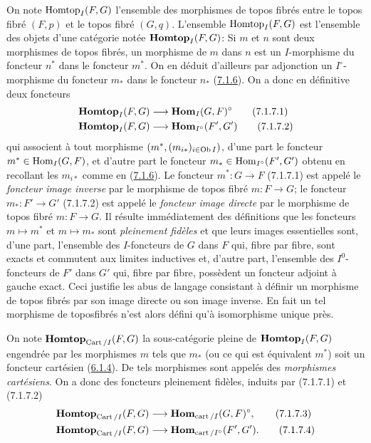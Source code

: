 \documentclass[10pt]{../fichiers-configuration-latex/smfart}
\begin{document}
On note $\operatorname{Homtop}_I (F, G)$ l'ensemble des morphismes de topos fibrés
entre le topos fibré $(F, p)$ et le topos fibré $(G, q)$. L'ensemble
$\operatorname{Homtop}_I(F, G)$ est l'ensemble des objets d'une catégorie notée
$\operatorname{\mathbf{Homtop}}_I(F, G)$: Si $m$ et $n$ sont deux morphismes de topos
fibrés, un morphisme de $m$ dans $n$ est un $I$-morphisme du
foncteur $n^{\ast}$ dans le foncteur $m^{\ast}$. On en déduit
d'ailleurs par adjonction un $I^{\circ}$-morphisme du foncteur
$m_{\ast}$ dans le foncteur $n_{\ast}$ (\hyperref[VI.subsubsec7.1.6]{7.1.6}). On
a donc en définitive deux foncteurs
\begin{align*}
\Hhomtop_I (F, G) & \to \Hhom_I (G, F)^{\circ}\tag{7.1.7.1}\\
\Hhomtop_I (F, G) &\to \Hhom_{I^{\circ}} (F', G')\tag{7.1.7.2}
\end{align*}
qui associent à tout morphisme $(m^{\ast}, (m_{i\ast})_{i \in \operatorname{Ob} I})$,
d'une part le foncteur $m^{\ast} \in \operatorname{Hom}_I(G, F)$, et d'autre part le
foncteur $m_{\ast} \in \operatorname{Hom}_{I^\circ} (F', G')$ obtenu en recollant les
$m_{i\ast}$ comme en (\hyperref[VI.subsubsec7.1.6]{7.1.6}). Le foncteur
$m^{\ast} : G \to F$ (7.1.7.1) est appelé le \emph{foncteur image
  inverse} par le morphisme de topos fibré $m : F \to G$; le  foncteur
$m_{\ast} : F'\to G'$ (7.1.7.2) est appelé le \emph{foncteur image
  directe} par le morphisme de topos fibré $m : F \to G$. Il résulte
immédiatement des définitions que les foncteurs $m \mapsto m^{\ast}$
et $m \mapsto m_{\ast}$ sont \emph{pleinement fidèles} et que leurs
images essentielles sont, d'une part, l'ensemble des $I$-foncteurs de
$G$ dans $F$ qui, fibre par fibre, sont exacts et commutent aux
limites inductives et, d'autre part, l'ensemble des $I^0$-foncteurs de
$F'$ dans $G'$ qui, fibre par fibre, possèdent un foncteur adjoint à
gauche exact. Ceci justifie les abus de langage consistant à définir
un morphisme de topos fibrés par son image directe ou son image
inverse. En fait un tel morphisme de topos\pageoriginale fibrés n'est
alors défini qu'à isomorphisme unique près.

On note $\operatorname{\mathbf{Homtop}}_{\operatorname{Cart} /I}(F, G)$ la sous-catégorie pleine de
$\operatorname{\mathbf{Homtop}}_I(F, G)$ engendrée par les morphismes $m$ tels que
$m_{\ast}$ (ou ce qui est équivalent $m^{\ast}$) soit un foncteur
cartésien (\hyperref[VI.subsubsec6.1.4]{6.1.4}). De tels morphismes sont appelés des
\emph{morphismes cartésiens}. On a donc des foncteurs pleinement
fidèles, induits par (7.1.7.1) et (7.1.7.2)
\begin{align*}
\Hhomtop_{\Cart/I} (F, G) & \to \Hhom_{\cart /I} (G,
  F)^{\circ}{\quoi},\tag{7.1.7.3}\\
\Hhomtop_{\Cart/I} (F, G) &\to \Hhom_{\cart /I^{\circ}} (F',
  G'){\quoi}.\tag{7.1.7.4}
\end{align*}
\end{document}
